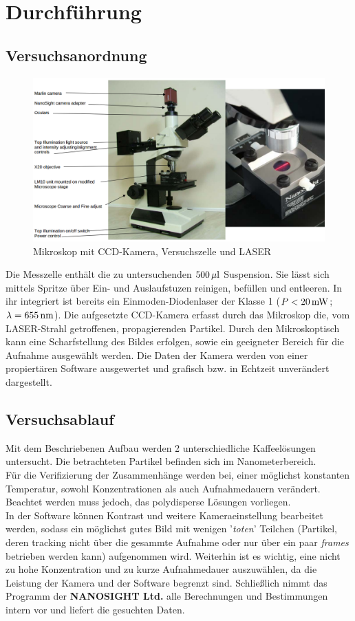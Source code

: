 \documentclass[numbers=noenddot,12pt,a4paper]{scrartcl}
\newcommand{\tilt}[1]{\textit{#1}}
\begin{document}
\section{Durchführung}
\subsection{Versuchsanordnung}
\begin{figure}[H]
\centering
\includegraphics[width=\textwidth]{mikro2.png}
\caption{Mikroskop mit CCD-Kamera, Versuchszelle und LASER} \label{aufbau}
\end{figure}
Die Messzelle enthält die zu untersuchenden  $\unit[500]{\mu l}$ Suspension. Sie lässt sich mittels Spritze über Ein- und Auslaufstuzen reinigen, befüllen und entleeren. In ihr integriert ist bereits ein Einmoden-Diodenlaser der Klasse 1 ($P\unit[<20]{mW}$; $\lambda=\unit[655]{nm}$). Die aufgesetzte CCD-Kamera erfasst durch das Mikroskop die, vom LASER-Strahl getroffenen, propagierenden Partikel. Durch den Mikroskoptisch kann eine Scharfstellung des Bildes erfolgen, sowie ein geeigneter Bereich für die Aufnahme ausgewählt werden. Die Daten der Kamera werden von einer propiertären Software ausgewertet und grafisch bzw. in Echtzeit unverändert dargestellt.
\subsection{Versuchsablauf}
Mit dem Beschriebenen Aufbau werden 2 unterschiedliche Kaffeelösungen untersucht. Die betrachteten Partikel befinden sich im Nanometerbereich.\\
Für die Verifizierung der Zusammenhänge werden bei, einer möglichst konstanten Temperatur, sowohl Konzentrationen als auch Aufnahmedauern verändert. Beachtet werden muss jedoch, das polydisperse Lösungen vorliegen.\\
In der Software können Kontrast und weitere Kameraeinstellung bearbeitet werden, sodass ein möglichst gutes Bild mit wenigen '\tilt{toten}' Teilchen (Partikel, deren tracking nicht über die gesammte Aufnahme oder nur über ein paar \tilt{frames} betrieben werden kann) aufgenommen wird. Weiterhin ist es wichtig, eine nicht zu hohe Konzentration und zu kurze Aufnahmedauer auszuwählen, da die Leistung der Kamera und der Software begrenzt sind. Schließlich nimmt das Programm der \textbf{NANOSIGHT Ltd.} alle Berechnungen und Bestimmungen intern vor und liefert die gesuchten Daten.
\end{document}
